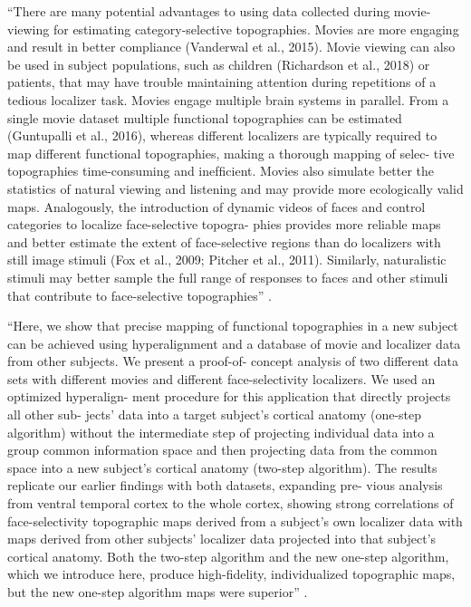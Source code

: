 ``There are many potential advantages to using data collected during
movie-viewing for estimating category-selective topographies. Movies are more
engaging and result in better compliance (Vanderwal et al., 2015). Movie viewing
can also be used in subject populations, such as children (Richardson et al.,
2018) or patients, that may have trouble maintaining attention during
repetitions of a tedious localizer task. Movies engage multiple brain systems in
parallel. From a single movie dataset multiple functional topographies can be
estimated (Guntupalli et al., 2016), whereas different localizers are typically
required to map different functional topographies, making a thorough mapping of
selec- tive topographies time-consuming and inefﬁcient. Movies also simulate
better the statistics of natural viewing and listening and may provide more
ecologically valid maps. Analogously, the introduction of dynamic videos of
faces and control categories to localize face-selective topogra- phies provides
more reliable maps and better estimate the extent of face-selective regions than
do localizers with still image stimuli (Fox et al., 2009; Pitcher et al., 2011).
Similarly, naturalistic stimuli may better sample the full range of responses to
faces and other stimuli that contribute to face-selective topographies''
\citep{jiahui2020predicting}.

``Here, we show that precise mapping of functional topographies in a new subject
can be achieved using hyperalignment and a database of movie and localizer data
from other subjects. We present a proof-of- concept analysis of two different
data sets with different movies and different face-selectivity localizers. We
used an optimized hyperalign- ment procedure for this application that directly
projects all other sub- jects’ data into a target subject’s cortical anatomy
(one-step algorithm) without the intermediate step of projecting individual data
into a group common information space and then projecting data from the common
space into a new subject’s cortical anatomy (two-step algorithm). The results
replicate our earlier ﬁndings with both datasets, expanding pre- vious analysis
from ventral temporal cortex to the whole cortex, showing strong correlations of
face-selectivity topographic maps derived from a subject’s own localizer data
with maps derived from other subjects’ localizer data projected into that
subject’s cortical anatomy. Both the two-step algorithm and the new one-step
algorithm, which we introduce here, produce high-ﬁdelity, individualized
topographic maps, but the new one-step algorithm maps were superior''
\citep{jiahui2020predicting}.

